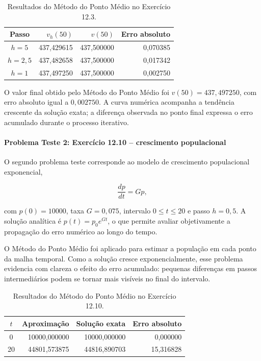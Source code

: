 \begin{table}[H]
    \centering
    \caption{Resultados do Método do Ponto Médio no Exercício 12.3.}
    \begin{tabular}{c|r|r|r}
        \textbf{Passo} & \textbf{\(v_h(50)\)} & \textbf{\(v(50)\)} & \textbf{Erro absoluto} \\
        \hline
        \(h=5\) & 437{,}429615 & 437{,}500000 & 0{,}070385 \\
        \(h=2{,}5\) & 437{,}482658 & 437{,}500000 & 0{,}017342 \\
        \(h=1\) & 437{,}497250 & 437{,}500000 & 0{,}002750 \\
    \end{tabular}
\end{table}

O valor final obtido pelo Método do Ponto Médio foi \(v(50)=437{,}497250\), com erro absoluto igual a \(0{,}002750\). A curva numérica acompanha a tendência crescente da solução exata; a diferença observada no ponto final expressa o erro acumulado durante o processo iterativo.

\paragraph{Problema Teste 2: Exercício 12.10 -- crescimento populacional}

O segundo problema teste corresponde ao modelo de crescimento populacional exponencial,

\[
    \frac{dp}{dt}=Gp,
\]

com \(p(0)=10000\), taxa \(G=0{,}075\), intervalo \(0\leq t\leq 20\) e passo \(h=0{,}5\). A solução analítica é \(p(t)=p_0e^{Gt}\), o que permite avaliar objetivamente a propagação do erro numérico ao longo do tempo.

O Método do Ponto Médio foi aplicado para estimar a população em cada ponto da malha temporal. Como a solução cresce exponencialmente, esse problema evidencia com clareza o efeito do erro acumulado: pequenas diferenças em passos intermediários podem se tornar mais visíveis no final do intervalo.

\begin{table}[H]
    \centering
    \caption{Resultados do Método do Ponto Médio no Exercício 12.10.}
    \begin{tabular}{c|r|r|r}
        \textbf{\(t\)} & \textbf{Aproximação} & \textbf{Solução exata} & \textbf{Erro absoluto} \\
        \hline
        0 & 10000{,}000000 & 10000{,}000000 & 0{,}000000 \\
        20 & 44801{,}573875 & 44816{,}890703 & 15{,}316828 \\
    \end{tabular}
\end{table}

